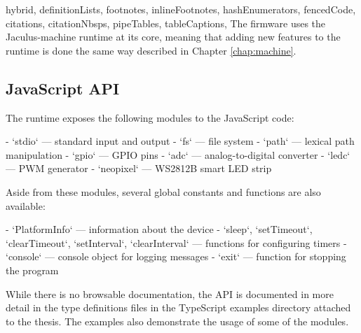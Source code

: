\begin{markdown*}{%
  hybrid,
  definitionLists,
  footnotes,
  inlineFootnotes,
  hashEnumerators,
  fencedCode,
  citations,
  citationNbsps,
  pipeTables,
  tableCaptions,
}
The firmware uses the Jaculus-machine runtime at its core, meaning that adding new features to the runtime is done the same way described in Chapter \ref{chap:machine}.

\subsection{JavaScript API}

The runtime exposes the following modules to the JavaScript code:

  - `stdio` --- standard input and output
  - `fs` --- file system
  - `path` --- lexical path manipulation
  - `gpio` --- GPIO pins
  - `adc` --- analog-to-digital converter
  - `ledc` --- PWM generator
  - `neopixel` --- WS2812B smart LED strip

\noindent
Aside from these modules, several global constants and functions are also available:

  - `PlatformInfo` --- information about the device
  - `sleep`, `setTimeout`, `clearTimeout`, `setInterval`, `clearInterval` --- functions for configuring timers
  - `console` --- console object for logging messages
  - `exit` --- function for stopping the program

\noindent
While there is no browsable documentation, the API is documented in more detail in the type definitions files in the TypeScript examples directory attached to the thesis. The examples also demonstrate the usage of some of the modules.

\end{markdown*}
